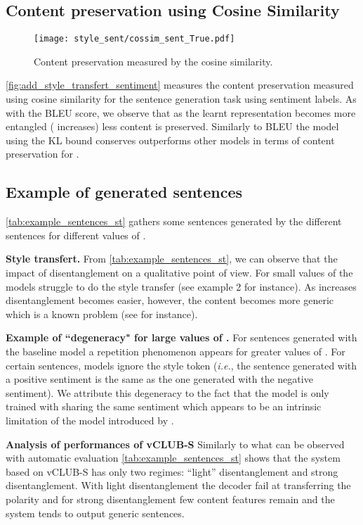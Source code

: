 \subsection{Content preservation using Cosine Similarity}
\begin{figure} 

\centering     \texttt{[image: style\_sent/cossim\_sent\_True.pdf]}
\caption{Content preservation measured by the cosine similarity. }\label{fig:add_style_transfert_sentiment}
\end{figure} 

\autoref{fig:add_style_transfert_sentiment} measures the content preservation measured using cosine similarity for the sentence generation task using sentiment labels. As with the BLEU score, we observe that as the learnt representation becomes more entangled ( increases) less content is preserved. Similarly to BLEU the model using the KL bound conserves outperforms other models in terms of content preservation for .

\subsection{Example of generated sentences}
\autoref{tab:example_sentences_st} gathers some sentences generated by the different sentences for different values of . 

\textbf{Style transfert.} From \autoref{tab:example_sentences_st}, we can observe that the impact of disentanglement on a qualitative point of view. For small values of  the models struggle to do the style transfer (see example 2 for instance). As  increases disentanglement becomes easier, however, the content becomes more generic which is a known problem (see \cite{mmi} for instance). 



\textbf{Example of ``degeneracy" for large values of .} For sentences generated with the baseline model a repetition phenomenon appears for greater values of . For certain sentences, models ignore the style token (\textit{i.e.}, the sentence generated with a positive sentiment is the same as the one generated with the negative sentiment). We attribute this degeneracy to the fact that the model is only trained with  sharing the same sentiment which appears to be an intrinsic limitation of the model introduced  by \cite{text}.

\textbf{Analysis of performances of vCLUB-S} Similarly to what can be observed with automatic evaluation \autoref{tab:example_sentences_st} shows that the system based on vCLUB-S has only two regimes: “light” disentanglement and strong disentanglement. With light disentanglement the decoder fail at transferring the polarity and for strong disentanglement few content features remain and the system tends to output generic sentences.

